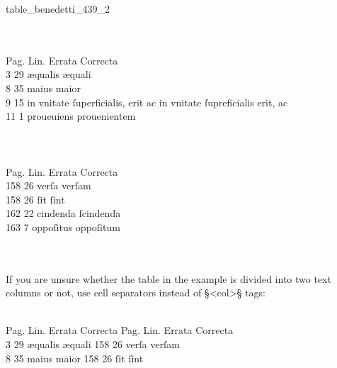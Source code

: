 \begin{sampleImage}{table_benedetti_439_2}

\begin{typeLatin}
 \\
 \\
Pag. \bold{#} Lin. \bold{#} Errata \bold{#} Correcta \\
3 \bold{#} 29 \bold{#} æqualis \bold{#} æquali \\
8 \bold{#} 35 \bold{#} maius \bold{#} maior \\
9 \bold{#} 15 \bold{#} in vnitate ſuperficialis, erit ac \bold{#} in vnitate ſupreficialis erit, ac \\
11 \bold{#} 1 \bold{#} proueuiens \bold{#} prouenientem \\
\someText \\
 \\
 \\
Pag. \bold{#} Lin. \bold{#} Errata \bold{#} Correcta \\
158 \bold{#} 26 \bold{#} verſa \bold{#} verſam \\
158 \bold{#} 26 \bold{#} ſit \bold{#} ſint \\
162 \bold{#} 22 \bold{#} cindenda \bold{#} ſcindenda \\
163 \bold{#} 7 \bold{#} oppoſitus \bold{#} oppoſitum \\
\someText \\
 \\
\end{typeLatin}

If you are unsure whether the table in the example is divided into two text columns or not, use cell separators instead of §<col>§ tags:

\begin{typeLatin}
 \\
Pag. \bold{#} Lin. \bold{#} Errata \bold{#} Correcta \bold{#} Pag. \bold{#} Lin. \bold{#} Errata \bold{#} Correcta \\
3 \bold{#} 29 \bold{#} æqualis \bold{#} æquali \bold{#} 158 \bold{#} 26 \bold{#} verſa \bold{#} verſam \\
8 \bold{#} 35 \bold{#} maius \bold{#} maior \bold{#} 158 \bold{#} 26 \bold{#} ſit \bold{#} ſint \\
\untranscribedText \\
\end{typeLatin}

\end{sampleImage}

